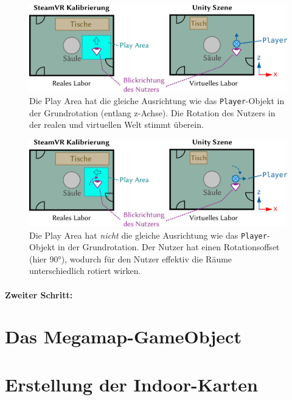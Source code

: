 \begin{figure}
    \includegraphics[width=\textwidth]{figures/environment_setup_correct}
    \caption{Die Play Area hat die gleiche Ausrichtung wie das \texttt{Player}-Objekt in der Grundrotation (entlang z-Achse). %
    Die Rotation des Nutzers in der realen und virtuellen Welt stimmt überein.}
    \label{fig:ve_setup_correct}
\end{figure}

\begin{figure}
    \includegraphics[width=\textwidth]{figures/environment_setup_wrong}
    \caption{Die Play Area hat \emph{nicht} die gleiche Ausrichtung wie das \texttt{Player}-Objekt in der Grundrotation. %
        Der Nutzer hat einen Rotationsoffset (hier \ang[detect-weight=true]{90}), wodurch für den Nutzer effektiv die Räume unterschiedlich rotiert wirken.}
    \label{fig:ve_setup_wrong}
\end{figure}

\paragraph{Zweiter Schritt:}

\section{Das Megamap-GameObject}


\section{Erstellung der Indoor-Karten}

